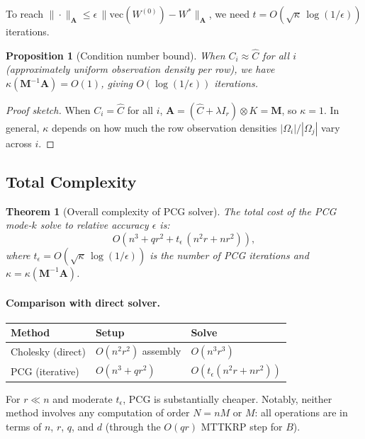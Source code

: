 \documentclass[12pt]{article}
\newtheorem{theorem}{Theorem}
\newtheorem{proposition}{Proposition}
\theoremstyle{definition}
\begin{document}
To reach $\|\cdot\|_{\mathbf{A}} \leq \epsilon\,\|\mathrm{vec}(W^{(0)}) - W^*\|_{\mathbf{A}}$, we need $t = O(\sqrt{\kappa}\,\log(1/\epsilon))$ iterations.

\begin{proposition}[Condition number bound]
When $C_i \approx \hat{C}$ for all $i$ (approximately uniform observation density per row), we have $\kappa(\mathbf{M}^{-1}\mathbf{A}) = O(1)$, giving $O(\log(1/\epsilon))$ iterations.
\end{proposition}

\begin{proof}[Proof sketch]
When $C_i = \hat{C}$ for all $i$, $\mathbf{A} = (\hat{C} + \lambda I_r)\otimes K = \mathbf{M}$, so $\kappa = 1$. In general, $\kappa$ depends on how much the row observation densities $|\Omega_i|/|\Omega_j|$ vary across $i$.
\end{proof}

\subsection{Total Complexity}

\begin{theorem}[Overall complexity of PCG solver]
The total cost of the PCG mode-$k$ solve to relative accuracy $\epsilon$ is:
\[
O\!\left(n^3 + qr^2 + t_\epsilon\,(n^2r + nr^2)\right),
\]
where $t_\epsilon = O(\sqrt{\kappa}\,\log(1/\epsilon))$ is the number of PCG iterations and $\kappa = \kappa(\mathbf{M}^{-1}\mathbf{A})$.
\end{theorem}

\paragraph{Comparison with direct solver.}
\begin{center}
\begin{tabular}{lll}
\hline
Method & Setup & Solve \\
\hline
Cholesky (direct) & $O(n^2r^2)$ assembly & $O(n^3r^3)$ \\
PCG (iterative) & $O(n^3 + qr^2)$ & $O(t_\epsilon(n^2r + nr^2))$ \\
\hline
\end{tabular}
\end{center}

For $r \ll n$ and moderate $t_\epsilon$, PCG is substantially cheaper. Notably, neither method involves any computation of order $N = nM$ or $M$: all operations are in terms of $n$, $r$, $q$, and $d$ (through the $O(qr)$ MTTKRP step for $B$).
\end{document}
